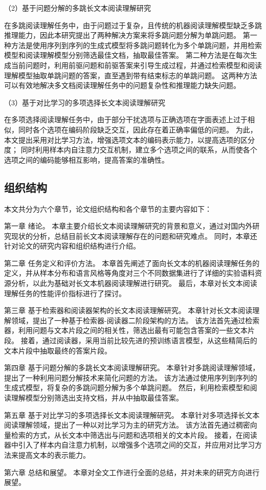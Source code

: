 （2）基于问题分解的多跳长文本阅读理解研究

在多跳阅读理解任务中，由于问题过于复杂，且传统的机器阅读理解模型缺乏多跳推理能力，因此本研究提出了两种解决方案来将多跳问题分解为单跳问题。
第一种方法是使用序列到序列的生成式模型\cite{Lewis2019BARTDS,Ni2021SentenceT5SS}将多跳问题转化为多个单跳问题，并用检索模型和阅读理解模型分别筛选最佳文档，抽取最佳答案。
第二种方法是在每次生成当前问题时，利用前驱问题和前驱答案来引导生成过程，并通过检索模型和阅读理解模型抽取单跳问题的答案，直至遇到带有结束标志的单跳问题。
这两种方法可以有效地解决多文档阅读理解任务中的问题复杂性和推理能力缺失问题。

（3）基于对比学习的多项选择长文本阅读理解研究

在多项选择阅读理解任务中，由于部分干扰选项与正确选项在字面表述上过于相似，同时各个选项在编码阶段缺乏交互，因此存在着正确率偏低的问题。
为此，本文提出采用对比学习方法\cite{gao2021simcse}，增强选项文本的编码表示能力，以提高选项的区分度；
同时利用样本内自注意力交互机制\cite{vaswani2017attention}，建立多个选项之间的联系，从而使各个选项之间的编码能够相互影响，提高答案的准确性。

\subsection{组织结构}
本文共分为六个章节，论文组织结构和各个章节的主要内容如下：

第一章 绪论。
本章主要介绍长文本阅读理解研究的背景和意义，通过对国内外研究现状的分析，总结目前长文本阅读理解存在的问题和研究难点。
同时，本章还针对论文的研究内容和组织结构进行介绍。

第二章 任务定义和评价方法。
本章首先阐述了面向长文本的机器阅读理解任务的定义，并从样本分布和语言风格等角度对三个不同数据集进行了详细的实验语料资源分析，以此为基础对长文本机器阅读理解进行研究。
最后，本章对长文本阅读理解任务的性能评价指标进行了探讨。

第三章 基于检索器和阅读器架构的长文本阅读理解研究。
本章针对长文本阅读理解领域，提出了一种基于检索器-阅读器二阶段架构的方法。
该方法首先通过检索器，利用问题与文本片段之间的相关性，筛选出最有可能包含答案的一些文本片段。
接着，通过阅读器，采用当前比较先进的预训练语言模型，从这些精简后的文本片段中抽取最终的答案片段。

第四章 基于问题分解的多跳长文本阅读理解研究。
本章针对多跳阅读理解领域，提出了一种利用问题分解技术来简化问题的方法。
该方法通过使用序列到序列的生成式模型，将复杂的多跳问题分解为多个单跳问题。
然后，利用检索模型和阅读理解模型分别筛选出支持文档，并从中抽取最佳答案。

第五章 基于对比学习的多项选择长文本阅读理解研究。
本章针对多项选择长文本阅读理解领域，提出了一种以对比学习为主的研究方法。
该方法首先通过稠密向量检索的方式，从长文本中筛选出与问题和选项相关的文本片段。
接着，在阅读器中引入了样本内自注意力机制，以增强多个选项之间的交互，并应用对比学习方法来提高文本的表示能力。

第六章 总结和展望。
本章对全文工作进行全面的总结，并对未来的研究方向进行展望。


